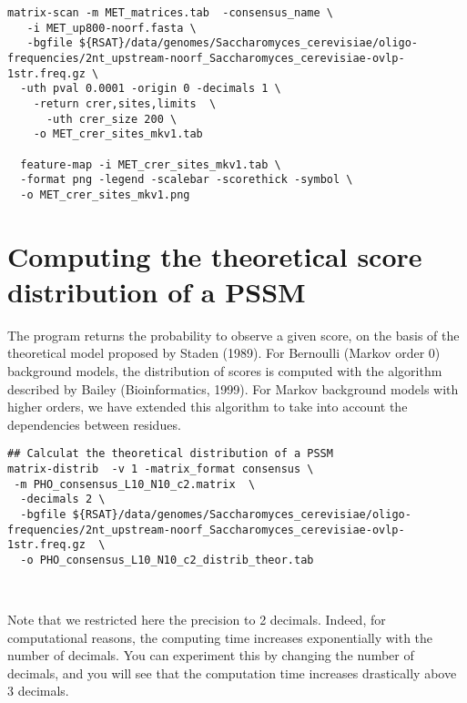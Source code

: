 {\color{Blue} \begin{footnotesize} 
\begin{verbatim}
matrix-scan -m MET_matrices.tab  -consensus_name \
   -i MET_up800-noorf.fasta \
   -bgfile ${RSAT}/data/genomes/Saccharomyces_cerevisiae/oligo-frequencies/2nt_upstream-noorf_Saccharomyces_cerevisiae-ovlp-1str.freq.gz \
  -uth pval 0.0001 -origin 0 -decimals 1 \
    -return crer,sites,limits  \
      -uth crer_size 200 \
    -o MET_crer_sites_mkv1.tab
   
  feature-map -i MET_crer_sites_mkv1.tab \
  -format png -legend -scalebar -scorethick -symbol \
  -o MET_crer_sites_mkv1.png    

\end{verbatim} \end{footnotesize}
}

\section{Computing the theoretical score distribution of a PSSM}

The program \program{matrix-distrib} returns the probability to observe a given score, on
the basis of the theoretical model proposed by Staden (1989). For Bernoulli (Markov order 0) background models, the distribution of scores is computed with the algorithm described by Bailey (Bioinformatics, 1999). For Markov background models with higher orders, we have extended this algorithm to take into account the dependencies between residues.


{\color{Blue} \begin{footnotesize} 
\begin{verbatim}
## Calculat the theoretical distribution of a PSSM
matrix-distrib  -v 1 -matrix_format consensus \
 -m PHO_consensus_L10_N10_c2.matrix  \
  -decimals 2 \
  -bgfile ${RSAT}/data/genomes/Saccharomyces_cerevisiae/oligo-frequencies/2nt_upstream-noorf_Saccharomyces_cerevisiae-ovlp-1str.freq.gz  \
  -o PHO_consensus_L10_N10_c2_distrib_theor.tab
  
  
\end{verbatim} \end{footnotesize}
}

Note that we restricted here the precision to 2 decimals. Indeed, for
computational reasons, the computing time increases exponentially with
the number of decimals. You can experiment this by changing the number
of decimals, and you will see that the computation time increases
drastically above 3 decimals.  

